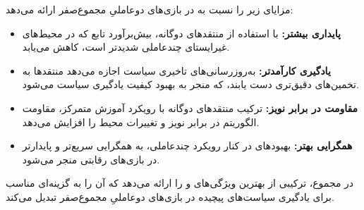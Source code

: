 مزایای زیر را نسبت به  در بازی‌های دو­عاملیِ مجموع­‌صفر ارائه می‌دهد:

\begin{itemize}
    \item \textbf{پایداری بیشتر:} با استفاده از منتقدهای دوگانه، بیش‌برآورد تابع  که در محیط‌های غیرایستای چند­عاملی شدیدتر است، کاهش می‌یابد.
    \item \textbf{یادگیری کارآمدتر:} به‌روزرسانی‌های تاخیری سیاست اجازه می‌دهد منتقدها به تخمین‌های دقیق‌تری دست یابند، که منجر به بهبود کیفیت یادگیری سیاست می‌شود.
    \item \textbf{مقاومت در برابر نویز:} ترکیب منتقدهای دوگانه با رویکرد آموزش متمرکز، مقاومت الگوریتم در برابر نویز و تغییرات محیط را افزایش می‌دهد.
    \item \textbf{همگرایی بهتر:} بهبودهای  در کنار رویکرد چند­عاملی، به همگرایی سریع‌تر و پایدارتر در بازی‌های رقابتی منجر می‌شود.
\end{itemize}

در مجموع،  ترکیبی از بهترین ویژگی‌های  و  را ارائه می‌دهد که آن را به گزینه‌ای مناسب برای یادگیری سیاست‌های پیچیده در بازی‌های دو­عاملیِ مجموع­‌صفر تبدیل می‌کند.